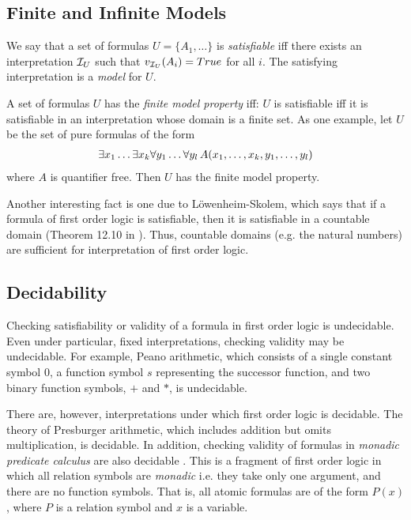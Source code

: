 \documentclass[10pt]{article}
\begin{document}
\subsection{Finite and Infinite Models}

We say that a set of formulas $U=\{A_1,\dots\}$ is \textit{satisfiable} iff there exists an interpretation $\mathcal{I}_U$ such that $v_{\mathcal{I}_U}(A_i)=True$ for all $i$. The satisfying interpretation is a \textit{model} for $U$. 

A set of formulas $U$ has the \textit{finite model property} iff: $U$ is satisfiable iff it is satisfiable in an interpretation whose domain is a finite set. As one example, let $U$ be the set of pure formulas of the form 
\begin{align*}
    \exists x_1 \dots \exists x_k \forall y_1 \dots \forall y_l \, A(x_1,\dots,x_k,y_1,\dots,y_l)
\end{align*}
where $A$ is quantifier free. Then $U$ has the finite model property.

Another interesting fact is one due to L\"{o}wenheim-Skolem, which says that if a formula of first order logic is satisfiable, then it is satisfiable in a countable domain (Theorem 12.10 in \cite{2012benari}). Thus, countable domains (e.g. the natural numbers) are sufficient for interpretation of first order logic.

\subsection{Decidability}

Checking satisfiability or validity of a formula in first order logic is undecidable. Even under particular, fixed interpretations, checking validity may be undecidable. For example, Peano arithmetic, which consists of a single constant symbol $0$, a function symbol $s$ representing the successor function, and two binary function symbols, $+$ and $*$, is undecidable. 

There are, however, interpretations under which first order logic is decidable. The theory of Presburger arithmetic, which includes addition but omits multiplication, is decidable. In addition, checking validity of formulas in \textit{monadic predicate calculus} are also decidable \cite{lewis1980complexity}. This is a fragment of first order logic in which all relation symbols are \textit{monadic} i.e. they take only one argument, and there are no function symbols. That is, all atomic formulas are of the form $P(x)$, where $P$ is a relation symbol and $x$ is a variable.
\end{document}
